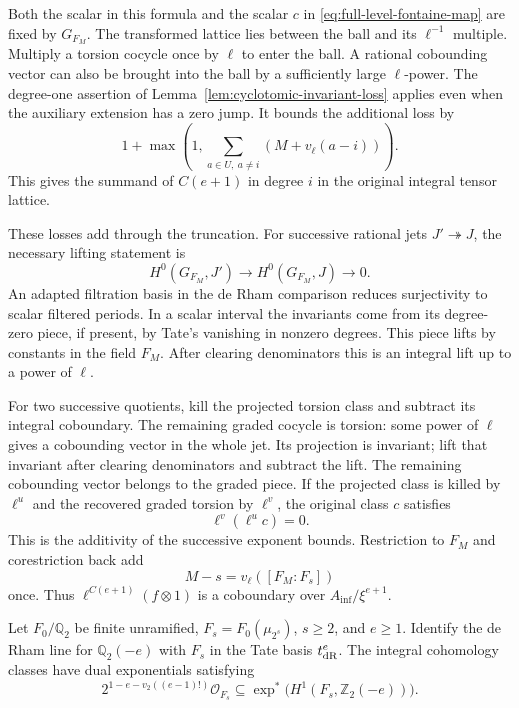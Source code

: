 Both the scalar in this formula and the scalar \(c\) in
\eqref{eq:full-level-fontaine-map} are fixed by \(G_{F_M}\).
The transformed lattice lies between the ball and
its \(\ell^{-1}\) multiple. Multiply a torsion cocycle
once by \(\ell\) to enter the ball. A rational
cobounding vector can also be brought into the ball
by a sufficiently large \(\ell\)-power.
The degree-one assertion of Lemma~\ref{lem:cyclotomic-invariant-loss}
applies even when the auxiliary extension has a zero jump. It bounds
the additional loss by
\[
   1+\max\left(1,\sum_{a\in U,\ a\ne i}(M+v_\ell(a-i))\right).
\]
This gives the summand of \(C(e+1)\) in degree \(i\)
in the original integral tensor lattice.

These losses add through the truncation.
For successive rational jets \(J'\twoheadrightarrow J\), the necessary lifting statement is
\[
 H^0(G_{F_M},J')\longrightarrow H^0(G_{F_M},J)\longrightarrow0 .
\]
An adapted filtration basis in the de Rham comparison reduces surjectivity to scalar filtered periods. In a scalar interval the
invariants come from its degree-zero piece, if
present, by Tate's vanishing in nonzero degrees.
This piece lifts by constants in the field \(F_M\).
After clearing denominators this is an integral
lift up to a power of \(\ell\).

For two successive quotients, kill the projected torsion class and subtract its integral coboundary. The remaining graded cocycle is torsion: some power of \(\ell\) gives a cobounding vector in the whole jet. Its
projection is invariant; lift that invariant
after clearing denominators and subtract the lift.
The remaining cobounding vector belongs to the
graded piece. If the projected class is killed by \(\ell^u\) and the recovered graded torsion by \(\ell^v\), the original class \(c\) satisfies
\[
 \ell^v(\ell^u c)=0.
\]
This is the additivity of the successive exponent bounds. Restriction to \(F_M\) and
corestriction back add
\[
 M-s=v_\ell([F_M:F_s])
\]
once. Thus \(\ell^{C(e+1)}(f\otimes1)\) is a
coboundary over \(A_{\inf}/\xi^{e+1}\).
\label{cor:cyclotomic-character-lifting-1}

\begin{lemma}
\label{lem:dyadic-integral-period}\label{hyp:positive-character-integral-period}
Let \(F_0/\mathbb Q_2\) be finite unramified, \(F_s=F_0(\mu_{2^s})\), \(s\ge2\), and \(e\ge1\). Identify the de Rham line for \(\mathbb Q_2(-e)\) with \(F_s\) in the Tate basis \(t_{\rm dR}^e\). The integral cohomology classes have dual exponentials satisfying
\[
  2^{1-e-v_2((e-1)!)}\mathcal O_{F_s}
           \subseteq\exp^*\!\bigl(H^1(F_s,\mathbb Z_2(-e))\bigr).
\]
\end{lemma}


